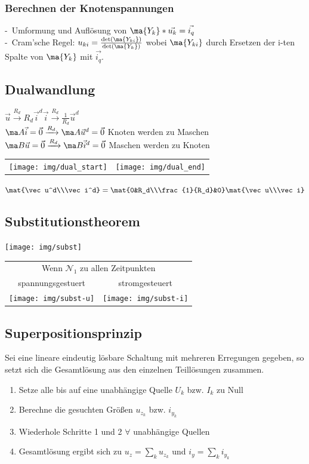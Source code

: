 \documentclass[fs, footer]{latex4ei}
\begin{document}
\begin{multicols*}{4}
    \subsubsection{Berechnen der Knotenspannungen}
    -\ Umformung und Auflösung von $\ma {Y_k} * \vec{u_k} = \vec{i_q}$\\
    -\ Cram'sche Regel: $u_{ki} = \frac{\det(\ma {Y_{ki}})}{\det(\ma{Y_k})}$ wobei $\ma {Y_{ki}}$ durch Ersetzen der i-ten Spalte von $\ma {Y_k}$ mit $\vec{i_q}$.\\

    \subsection{Dualwandlung}
    $\vec u \xrightarrow{R_d} R_d\vec i^d$\qquad$\vec i \xrightarrow{R_d} \frac{1}{R_d}\vec u^d$\\
    $\ma A\vec i = \vec 0 \xrightarrow{R_d} \ma A\vec u^d = \vec 0$ Knoten werden zu Maschen\\
    $\ma B\vec u = \vec 0 \xrightarrow{R_d} \ma B\vec i^d = \vec 0$ Maschen werden zu Knoten\\
    \begin{tabular}{cc}
        \texttt{[image: img/dual\_start]} &
        \texttt{[image: img/dual\_end]}
    \end{tabular}
    $\mat{\vec u^d\\\vec i^d}=\mat{0&R_d\\\frac{1}{R_d}&0}\mat{\vec u\\\vec i}$

    \subsection{Substitutionstheorem}
    \texttt{[image: img/subst]}\\
    \begin{tabular}{cc}
        \multicolumn{2}{c}{Wenn $\mathcal N_1$ zu allen Zeitpunkten} \\
        spannungsgestuert                        & stromgesteuert    \\
        \texttt{[image: img/subst-u]} &
        \texttt{[image: img/subst-i]}
    \end{tabular}

    \subsection{Superpositionsprinzip}
    Sei eine lineare eindeutig lösbare Schaltung mit mehreren Erregungen gegeben, so setzt sich die Gesamtlösung aus den einzelnen Teillösungen zusammen.
    \begin{enumerate}\itemsep0pt
        \item Setze alle bis auf eine unabhängige Quelle $U_k$ bzw. $I_k$ zu Null
        \item Berechne die gesuchten Größen $u_{z_k}$ bzw. $i_{y_k}$
        \item Wiederhole Schritte 1 und 2 $\forall$ unabhängige Quellen
        \item Gesamtlösung ergibt sich zu $u_z = \sum_ku_{z_k}$ und $i_y = \sum_ki_{y_k}$
    \end{enumerate}


\end{multicols*}
\end{document}
